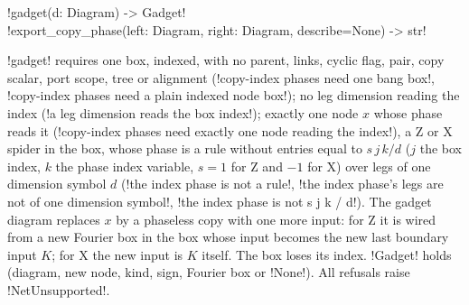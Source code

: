 {\begin{signature}
\py!gadget(d: Diagram) -> Gadget!\\
\py!export_copy_phase(left: Diagram, right: Diagram, describe=None) -> str!
\end{signature}
\noindent \py!gadget! requires one box, indexed, with no parent, links, cyclic flag, pair, copy
scalar, port scope, tree or alignment (\code!copy-index phases need one bang box!,
\code!copy-index phases need a plain indexed node box!); no leg dimension reading the index
(\code!a leg dimension reads the box index!); exactly one node $x$ whose phase reads it
(\code!copy-index phases need exactly one node reading the index!), a Z or X spider in the box,
whose phase is a rule without entries equal to $s\,j\,k/d$ ($j$ the box index, $k$ the phase
index variable, $s = 1$ for Z and $-1$ for X) over legs of one dimension symbol $d$
(\code!the index phase is not a rule!, \code!the index phase's legs are not of one dimension symbol!,
\code!the index phase is not s j k / d!). The gadget diagram replaces $x$ by a phaseless copy
with one more input: for Z it is wired from a new Fourier box in the box whose input becomes the
new last boundary input $K$; for X the new input is $K$ itself. The box loses its index.
\py!Gadget! holds (diagram, new node, kind, sign, Fourier box or \py!None!). All refusals raise
\py!NetUnsupported!.

}
